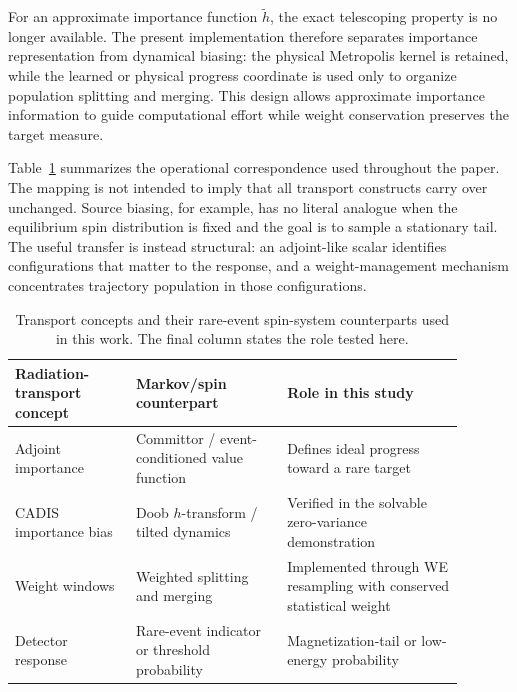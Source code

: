 \documentclass[a4paper,fleqn]{cas-sc}
\begin{document}
For an approximate importance function $\tilde h$, the exact telescoping property is no longer available. The present implementation therefore separates importance representation from dynamical biasing: the physical Metropolis kernel is retained, while the learned or physical progress coordinate is used only to organize population splitting and merging. This design allows approximate importance information to guide computational effort while weight conservation preserves the target measure.

Table~\ref{tab:correspondence} summarizes the operational correspondence used throughout the paper. The mapping is not intended to imply that all transport constructs carry over unchanged. Source biasing, for example, has no literal analogue when the equilibrium spin distribution is fixed and the goal is to sample a stationary tail. The useful transfer is instead structural: an adjoint-like scalar identifies configurations that matter to the response, and a weight-management mechanism concentrates trajectory population in those configurations.

\begin{table}[H]
\centering
\caption{Transport concepts and their rare-event spin-system counterparts used in this work. The final column states the role tested here.}
\label{tab:correspondence}
\begin{tabular}{p{0.24\linewidth}p{0.30\linewidth}p{0.35\linewidth}}
\toprule
Radiation-transport concept & Markov/spin counterpart & Role in this study \\
\midrule
Adjoint importance & Committor / event-conditioned value function & Defines ideal progress toward a rare target \\
CADIS importance bias & Doob $h$-transform / tilted dynamics & Verified in the solvable zero-variance demonstration \\
Weight windows & Weighted splitting and merging & Implemented through WE resampling with conserved statistical weight \\
Detector response & Rare-event indicator or threshold probability & Magnetization-tail or low-energy probability \\
\bottomrule
\end{tabular}
\end{table}
\end{document}
